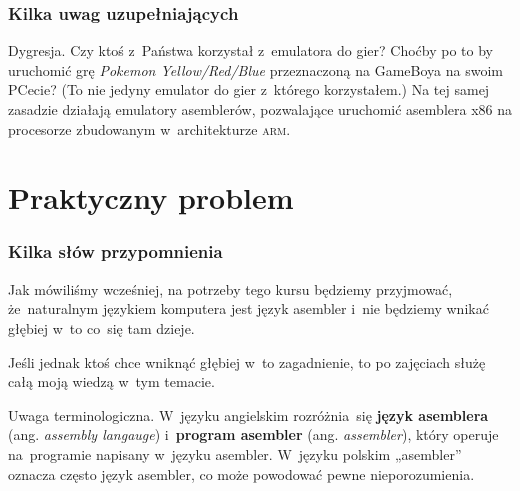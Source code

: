 \documentclass[10pt,t]{beamer}
\begin{document}





\begin{frame}
  \frametitle{Kilka uwag uzupełniających}


  \alert{Dygresja.} Czy ktoś z~Państwa korzystał z~emulatora do gier?
  Choćby po to by uruchomić grę \textit{Pokemon Yellow/Red/Blue}
  przeznaczoną na GameBoya na swoim PCecie? (To nie jedyny emulator do gier
  z~którego korzystałem.) Na tej samej zasadzie działają emulatory
  asemblerów, pozwalające uruchomić asemblera x86 na procesorze
  zbudowanym w~architekturze \textsc{arm}.



\end{frame}

























\section{Praktyczny problem}



\begin{frame}
  \frametitle{Kilka słów przypomnienia}


  Jak mówiliśmy wcześniej, na potrzeby tego kursu będziemy przyjmować,
  że~naturalnym językiem komputera jest język asembler i~nie będziemy
  wnikać głębiej w~to co~się tam dzieje.

  Jeśli jednak ktoś chce wniknąć głębiej w~to zagadnienie, to po zajęciach
  służę całą moją wiedzą w~tym temacie.

  \alert{Uwaga terminologiczna.} W~języku angielskim rozróżnia~się
  \textbf{język asemblera} (ang. \textit{assembly langauge})
  i~\textbf{program asembler} (ang. \textit{assembler}), który operuje
  na~programie napisany w~języku asembler. W~języku polskim „asembler”
  oznacza często język asembler, co może powodować pewne nieporozumienia.

\end{frame}
\end{document}
